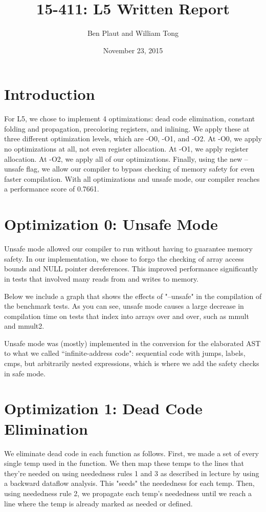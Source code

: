 \documentclass{article}
\title{15-411: L5 Written Report}
\author{Ben Plaut and William Tong}
\date{November 23, 2015}
\begin{document}
\maketitle

\section{Introduction}

For L5, we chose to implement 4 optimizations: dead code elimination, constant folding and propagation, precoloring registers, and inlining. We apply these at three different optimization levels, which are -O0, -O1, and -O2. At -O0, we apply no optimizations at all, not even register allocation. At -O1, we apply register allocation. At -O2, we apply all of our optimizations. Finally, using the new --unsafe flag, we allow our compiler to bypass checking of memory safety for even faster compilation. With all optimizations and unsafe mode, our compiler reaches a performance score of 0.7661.

\section{Optimization 0: Unsafe Mode}

Unsafe mode allowed our compiler to run without having to guarantee memory safety. In our implementation, we chose to forgo the checking of array access bounds and NULL pointer dereferences. This improved performance significantly in tests that involved many reads from and writes to memory. 

Below we include a graph that shows the effects of "--unsafe" in the compilation of the benchmark tests. As you can see, unsafe mode causes a large decrease in compilation time on tests that index into arrays over and over, such as mmult and mmult2. 






Unsafe mode was (mostly) implemented in the conversion for the elaborated AST to what we called ``infinite-address code": sequential code with jumps, labels, cmps, but arbitrarily nested expressions, which is where we add the safety checks in safe mode.

\section{Optimization 1: Dead Code Elimination}

We eliminate dead code in each function as follows. First, we made a set of every single temp used in the function. We then map these temps to the lines that they're needed on using neededness rules 1 and 3 as described in lecture by using a backward dataflow analysis. This "seeds" the neededness for each temp. Then, using neededness rule 2, we propagate each temp's neededness until we reach a line where the temp is already marked as needed or defined. 
\end{document}
